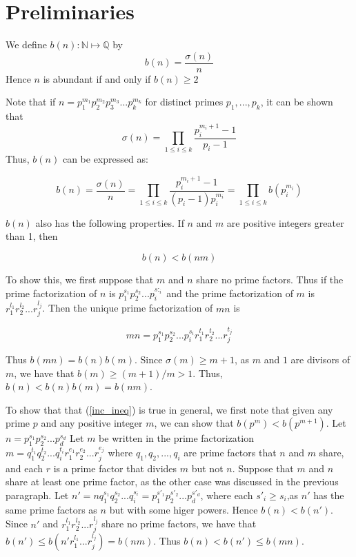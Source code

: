 \documentclass[../paper.tex]{article}
\begin{document}
\section{Preliminaries}

We define $b(n): \mathbb{N} \mapsto \mathbb{Q}$ by
%
$$b(n) = \frac{\sigma(n)}{n} $$
%
Hence $n$ is abundant if and only if $b(n) \geq 2$

Note that if $n=p_1^{m_1}p_2^{m_2}p_3^{m_3}...p_{k}^{m_k}$ 
for distinct primes $p_1, ..., p_k$, it can be shown that 
%
$$\sigma(n) = \prod_{1 \leq i \leq k} \frac{p_i^{m_i + 1} -1}{p_i -1}$$
%
Thus, $b(n)$ can be expressed as:


\begin{equation}\label{b_stuff}
  b(n) = \frac{\sigma(n)}{n} = \prod_{1 \leq i \leq k} 
  \frac{p_i^{m_i + 1} -1}{(p_i -1)p_{i}^{m_{i}}}
  =\prod_{1 \leq i \leq k} b(p_i^{m_i})
\end{equation}

$b(n)$ also has the following properties. If $n$ and $m$ are positive
integers greater than 1, then 

\begin{equation}\label{inc_ineq}
  b(n) < b(nm) %
\end{equation}

To show this, we first suppose that $m$ and $n$ share no prime factors.
Thus if the prime factorization of $n$ is $p_1^{s_1} p_2^{s_2} ... p_i^{s:_i}$ 
and the prime factorization of $m$ is $r_1^{l_1} r_2^{l_2} ... r_j^{l_j}$.
Then the unique prime factorization of $mn$ is 

$$mn = p_1^{s_1} p_2^{s_2} ... p_i^{s_i} r_1^{t_1} r_2^{t_2} ... r_j^{t_j}$$

Thus $b(mn) = b(n)b(m)$. Since $\sigma(m) \geq m + 1$, as $m$ and 
$1$ are divisors of $m$, we have that $b(m) \geq (m + 1) / m > 1$.
Thus,
$b(n) < b(n)b(m) = b(nm)$. 


To show that that (\ref{inc_ineq}) is true in general,
we first note that given any prime $p$ and
any positive integer $m$, we can show that $b(p^m) < b(p^{m + 1})$.
Let $n = p_1^{s_1} p_2^{s_2}... p_d^{s_d}$ 
Let $m$ be written in the prime factorization 
$m = q_1^{t_1} q_2^{t_2} ... q_i^{t_i} 
r_1^{e_1} r_2^{e_2} ... r_j^{e_j}$ where 
$q_1, q_2, ..., q_i$ are prime factors that $n$ and $m$ share,
and each $r$ is a prime factor that divides $m$ but not $n$.
Suppose that $m$ and $n$ share at least one prime factor, as the 
other case was discussed in the previous paragraph.
%
Let $n' = n q_1^{s_1} q_2^{s_2} ... q_i^{s_i} =
p_1^{s'_1} p_2^{s'_2} ... p_d^{s'_d}$, where each $s'_i \geq s_i$,as
$n'$ has the same prime factors as $n$ but with some higer powers.
Hence $b(n) < b(n')$. Since $n'$ and $r_1^{l_1} r_2^{l_2} ... r_j^{l_j}$
share no prime factors, we have that 
$b(n') \leq b(n' r_1^{l_1} ... r_j^{l_j}) = b(nm)$.
Thus $b(n) < b(n') \leq b(mn)$.
\end{document}
